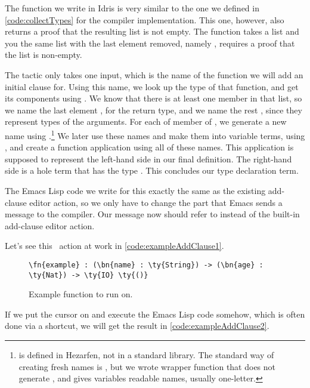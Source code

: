 The  function we write in Idris is very similar to the one we
defined in \autoref{code:collectTypes} for the compiler implementation.
This one, however, also returns a proof that the resulting list is not empty.
The function takes a list and you the same list with the last element removed,
namely , requires a proof that the list is non-empty.

The  tactic only takes one input, which is the name of the function
we will add an initial clause for.
Using this name, we look up the type of that function, and get its components
using . We know that there is at least one member in that
list, so we name the last element , for the return type, and we name
the rest , since they represent types of the arguments.
For each of member of , we generate a new name using
.\footnote{ is defined in Hezarfen, not in a standard
library. The standard way of creating fresh names is , but we wrote
wrapper function  that does not generate , and gives variables
readable names, usually one-letter.} We later use these names and make them
into variable terms, using , and create a function application using
all of these names. This application is supposed to represent the left-hand
side in our final definition. The right-hand side is a hole term that has the
type .  This concludes our type declaration term.

The Emacs Lisp code we write for this exactly the same as the existing
add-clause editor action, so we only have to change the part that Emacs sends a
message to the compiler. Our message now should refer to  instead
of the built-in add-clause editor action.

Let's see this \Elab\ action at work in \autoref{code:exampleAddClause1}.

\begin{figure}[ht]
\caption{Example function to run  on.}
\label{code:exampleAddClause1}
\begin{Verbatim}[framesep=2mm, label=\footnotesize{\normalfont{Idris}}, labelposition=topline]
\fn{example} : (\bn{name} : \ty{String}) -> (\bn{age} : \ty{Nat}) -> \ty{IO} \ty{()}
\end{Verbatim}
\end{figure}

If we put the cursor on  and execute the Emacs Lisp code somehow, which is often done via a shortcut, we will get the result in \autoref{code:exampleAddClause2}.


